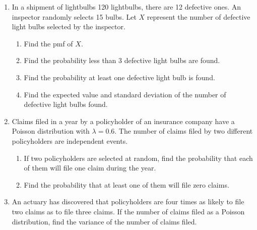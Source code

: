 \documentclass{article}
\begin{document}
\begin{enumerate}
    \item In a shipment of lightbulbs 120 lightbulbs, there are 12 defective ones. An inspector randomly selects 15 bulbs. Let $X$ represent the number of defective light bulbs selected by the inspector.%
    \begin{enumerate}
        \item Find the pmf of $X$.
        \item Find the probability less than 3 defective light bulbs are found. 
        \item Find the probability at least one defective light bulb is found.
        \item Find the expected value and standard deviation of the number of defective light bulbs found.
    \end{enumerate}\bigskip
    
    \newpage
    
    \item Claims filed in a year by a policyholder of an insurance company have a Poisson distribution with $\lambda = 0.6$. The number of claims filed by two different policyholders are independent events.%
    \begin{enumerate}
        \item If two policyholders are selected at random, find the probability that each of them will file one claim during the year.
        \item Find the probability that at least one of them will file zero claims.
    \end{enumerate}\bigskip
    
    \item An actuary has discovered that policyholders are four times as likely to file two claims as to file three claims. If the number of claims filed as a Poisson distribution, find the variance of the number of claims filed.%
    
\end{enumerate}

\vspace{100pt}
\end{document}
